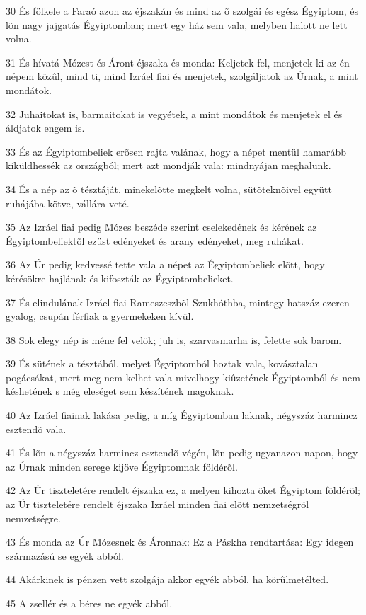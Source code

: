 \par 30 És fölkele a Faraó azon az éjszakán és mind az õ szolgái és egész Égyiptom, és lõn nagy jajgatás Égyiptomban; mert egy ház sem vala, melyben halott ne lett volna.
\par 31 És hívatá Mózest és Áront éjszaka és monda: Keljetek fel, menjetek ki az én népem közûl, mind ti, mind Izráel fiai és menjetek, szolgáljatok az Úrnak, a mint mondátok.
\par 32 Juhaitokat is, barmaitokat is vegyétek, a mint mondátok és menjetek el és áldjatok engem is.
\par 33 És az Égyiptombeliek erõsen rajta valának, hogy a népet mentül hamarább kiküldhessék az országból; mert azt mondják vala: mindnyájan meghalunk.
\par 34 És a nép az õ tésztáját, minekelõtte megkelt volna, sütõteknõivel együtt ruhájába kötve, vállára veté.
\par 35 Az Izráel fiai pedig Mózes beszéde szerint cselekedének és kérének az Égyiptombeliektõl ezüst edényeket és arany edényeket, meg ruhákat.
\par 36 Az Úr pedig kedvessé tette vala a népet az Égyiptombeliek elõtt, hogy kérésökre hajlának és kifoszták az Égyiptombelieket.
\par 37 És elindulának Izráel fiai Rameszeszbõl Szukhóthba, mintegy hatszáz ezeren gyalog, csupán férfiak a gyermekeken kívül.
\par 38 Sok elegy nép is méne fel velök; juh is, szarvasmarha is, felette sok barom.
\par 39 És sütének a tésztából, melyet Égyiptomból hoztak vala, kovásztalan pogácsákat, mert meg nem kelhet vala mivelhogy kiûzetének Égyiptomból és nem késhetének s még eleséget sem készítének magoknak.
\par 40 Az Izráel fiainak lakása pedig, a míg Égyiptomban laknak, négyszáz harmincz esztendõ vala.
\par 41 És lõn a négyszáz harmincz esztendõ végén, lõn pedig ugyanazon napon, hogy az Úrnak minden serege kijöve Égyiptomnak földérõl.
\par 42 Az Úr tiszteletére rendelt éjszaka ez, a melyen kihozta õket Égyiptom földérõl; az Úr tiszteletére rendelt éjszaka Izráel minden fiai elõtt nemzetségrõl nemzetségre.
\par 43 És monda az Úr Mózesnek és Áronnak: Ez a Páskha rendtartása: Egy idegen származású se egyék abból.
\par 44 Akárkinek is pénzen vett szolgája akkor egyék abból, ha körûlmetélted.
\par 45 A zsellér és a béres ne egyék abból.
